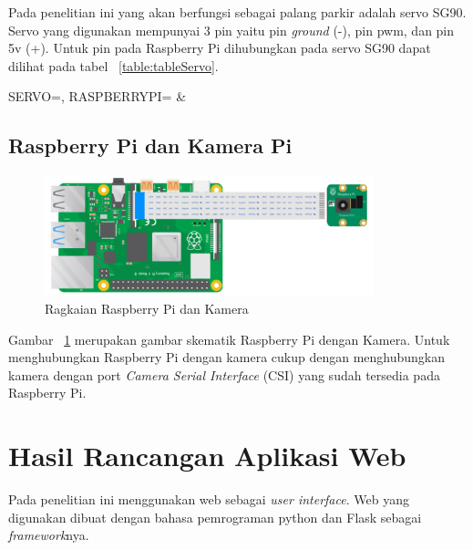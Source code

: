 Pada penelitian ini yang akan berfungsi sebagai palang parkir adalah servo SG90. Servo yang digunakan mempunyai 3 pin yaitu pin \textit{ground} (-), pin pwm, dan pin 5v (+). Untuk pin pada Raspberry Pi dihubungkan pada servo SG90 dapat dilihat pada tabel ~\ref{table:tableServo}.

\begin{atable}
    \caption{Rangkaian pin Servo ke Raspberry Pi}
    \label{table:tableServo}
        {
            SERVO=\SERVO, 
            RASPBERRYPI=\RASPBERRYPI}
        {
            \SERVO & 
            \RASPBERRYPI}
\end{atable}

\subsection{Raspberry Pi dan Kamera Pi}
\begin{figure} [H]
    \includegraphics[width=0.85\textwidth, center]{images/skematik-kamera.png}
    \caption{Ragkaian Raspberry Pi dan Kamera}
    \label{fig:skematikKamera}
\end{figure}

Gambar ~\ref{fig:skematikKamera} merupakan gambar skematik Raspberry Pi dengan Kamera. Untuk menghubungkan Raspberry Pi dengan kamera cukup dengan menghubungkan kamera dengan port \textit{Camera Serial Interface} (CSI) yang sudah tersedia pada Raspberry Pi.


\section{Hasil Rancangan Aplikasi Web}
Pada penelitian ini menggunakan web sebagai \textit{user interface}. Web yang digunakan dibuat dengan bahasa pemrograman python dan Flask sebagai \textit{framework}nya.

